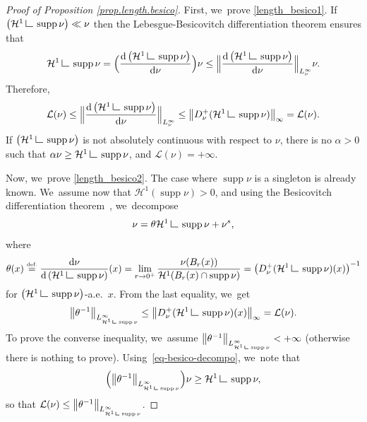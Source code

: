 \documentclass[JEP,XML,SOM,Unicode,NoFloatCountersInSection,published]{cedram}
\theoremstyle{definition}
\newcommand{\eqdef}{\ensuremath{\stackrel{\mbox{\upshape\tiny def.}}{=}}}
\newcommand{\norm}[1]{\left\lVert#1\right\rVert}
\newcommand{\Bnorm}[1]{\Bigl\lVert#1\Bigr\rVert}
\newcommand\LM[1]{\hbox{\vrule width.5pt \vbox to#1pt{\vfill \hrule width#1pt height.5pt}}}
\newcommand\LL{{\mathchoice {\>\LM7\>}{\>\LM7\>}{\,\LM5\,}{\,\LM{3.35}\,}}}
\newcommand{\mres}{\LL}
\newcommand\cH{\mathcal{H}}
\DeclareMathOperator{\supp}{supp}
\newcommand\dd{\mathrm{d}}
\begin{document}
\begin{proof}[Proof of Proposition \ref{prop.length.besico}]
First, we~prove \eqref{length_besico1}. If $\left(\cH^1\mres \supp \nu\right) \ll \nu$ then the Lebesgue-Besicovitch differentiation theorem ensures that
\begin{equation*}
\cH^1\mres \supp \nu = \Bigl(\frac{\dd \left(\cH^1\mres \supp\nu\right)}{\dd \nu}\Bigr)\nu \leq \Bnorm{\frac{\dd \left(\cH^1\mres \supp\nu\right)}{\dd \nu}}_{L^{\infty}_\nu}\nu.
\end{equation*}
Therefore,
\begin{equation*}
\mathcal{L}(\nu)\leq \Bnorm{\frac{\dd \left(\cH^1\mres \supp\nu\right)}{\dd \nu}}_{L^{\infty}_\nu} \leq \norm{D^+_\nu(\cH^1\mres \supp\nu)}_{\infty}=\mathcal{L}(\nu).
\end{equation*}
If $\left(\cH^1\mres \supp \nu\right)$ is not absolutely continuous with respect to $\nu$, there is no $\alpha>0$ such that $\alpha \nu \geq \cH^1\mres \supp\nu$, and $\mathcal{L}(\nu)=+\infty$.

Now, we~prove \eqref{length_besico2}. The case where $\supp \nu$ is a singleton is already known. We~\hbox{assume} now that $\cH^1(\supp \nu)>0$, and using the Besicovitch differentiation theorem~\cite[Th.\,2.22]{ambrosio2000functions}, we~decompose
\begin{equation}
\nu = \theta\cH^1\mres \supp \nu + \nu^s,\label{eq-besico-decompo}
\end{equation}
where
\[
\theta(x)\eqdef \frac{\dd \nu}{\dd \left(\cH^1\mres \supp\nu\right)}(x)= \lim_{r \to 0^+} \frac{\nu(B_r(x))}{\cH^1(B_r(x)\cap \supp \nu)} =\left(D^+_\nu(\cH^1\mres \supp\nu)(x)\right)^{-1}
\]
for $\left(\cH^1\mres \supp\nu\right)$-a.e.\ $x$. From the last equality, we~get
\begin{equation*}
\norm{\theta^{-1}}_{L^{\infty}_{\cH^1\mres \supp\nu}} \leq \norm{D^+_\nu(\cH^1\mres \supp\nu)(x)}_\infty =\mathcal{L}(\nu).
\end{equation*}
To prove the converse inequality, we~assume $\norm{\theta^{-1}}_{L^{\infty}_{\cH^1\mres \supp\nu}}<+\infty$ (otherwise there is nothing to prove). Using~\eqref{eq-besico-decompo}, we~note that
\begin{equation*}
\Bigl(\norm{\theta^{-1}}_{L^{\infty}_{\cH^1\mres \supp\nu}}\Bigr)\nu \ge \cH^1\mres \supp\nu,
\end{equation*}
so that $\mathcal{L}(\nu)\le \norm{\theta^{-1}}_{L^{\infty}_{\cH^1\mres \supp\nu}}$.
\end{proof}
\end{document}
